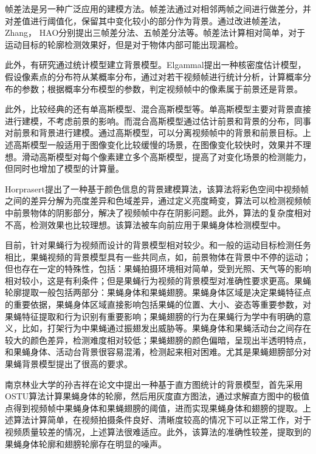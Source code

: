 帧差法是另一种广泛应用的建模方法。帧差法通过对相邻两帧之间进行做差分，并对差值进行阈值化，保留其中变化较小的部分作为背景。通过改进帧差法，Zhang， HAO分别提出三帧差分法、五帧差分法等\cite{zhang2012three, hao2012moving}。帧差法计算相对简单，对于运动目标的轮廓检测效果好，但是对于物体内部可能出现漏检。

此外，有研究通过统计模型建立背景模型。Elgammal提出一种核密度估计模型\cite{elgammal2002background}，假设像素点的分布符从某概率分布，通过对若干视频帧进行统计分析，计算概率分布的参数；根据概率分布模型的参数，判定视频帧中的像素属于前景还是背景。

此外，比较经典的还有单高斯模型、混合高斯模型等\cite{gaussian_1997,power2002understanding,zivkovic2004improved}。单高斯模型主要对背景直接进行建模，不考虑前景的影响。而混合高斯模型通过估计前景和背景的分布，同事对前景和背景进行建模。通过高斯模型，可以分离视频帧中的背景和前景目标。上述高斯模型一般适用于图像变化比较缓慢的场景，在图像变化较快时，效果并不理想。滑动高斯模型对每个像素建立多个高斯模型\cite{martel2005moving}，提高了对变化场景的检测能力，但同时也增加了模型的计算量。

Horprasert提出了一种基于颜色信息的背景建模算法\cite{shadow_2000}，该算法将彩色空间中视频帧之间的差异分解为亮度差异和色域差异，通过定义亮度畸变，算法可以检测视频帧中前景物体的阴影部分，解决了视频帧中存在阴影问题。此外，算法的复杂度相对不高，检测效果也比较理想。该算法被车向前应用于果蝇身体检测模型中\cite{chexiangqian}。

目前，针对果蝇行为视频而设计的背景模型相对较少。和一般的运动目标检测任务相比，果蝇视频的背景模型具有一些共同点，如，前景物体在背景中不停的运动；但也存在一定的特殊性，包括：果蝇拍摄环境相对简单，受到光照、天气等的影响相对较小，这是有利条件；但是果蝇行为视频的背景模型对准确性要求更高。果蝇轮廓提取一般包括两部分：果蝇身体和果蝇翅膀。果蝇身体区域是决定果蝇特征点的重要依据，果蝇身体区域直接影响包括果蝇的位置、大小、姿态等重要参数，对果蝇特征提取和行为识别有重要影响；果蝇翅膀的行为在果蝇行为学中有明确的意义，比如，打架行为中果蝇通过振翅发出威胁等\cite{fly_fighter_2006}。果蝇身体和果蝇活动台之间存在较大的颜色差异，检测难度相对较低；果蝇翅膀的颜色偏暗，呈现出半透明特点，和果蝇身体、活动台背景很容易混淆，检测起来相对困难。尤其是果蝇翅膀部分对果蝇背景模型提出了很高的要求。

南京林业大学的孙吉祥在论文中提出一种基于直方图统计的背景模型\cite{孙吉祥2014果蝇求偶行为的图像识别算法研究}，首先采用OSTU算法计算果蝇身体的轮廓\cite{otsu1975threshold}，然后用灰度直方图法，通过求解直方图中的极值点得到视频帧中果蝇身体和果蝇翅膀的阈值，进而实现果蝇身体和翅膀的提取。上述算法计算简单，在视频拍摄条件良好、清晰度较高的情况下可以正常工作，对于视频质量较差的情况，上述算法很难适应。此外，该算法的准确性较差，提取到的果蝇身体轮廓和翅膀轮廓存在明显的噪声。

